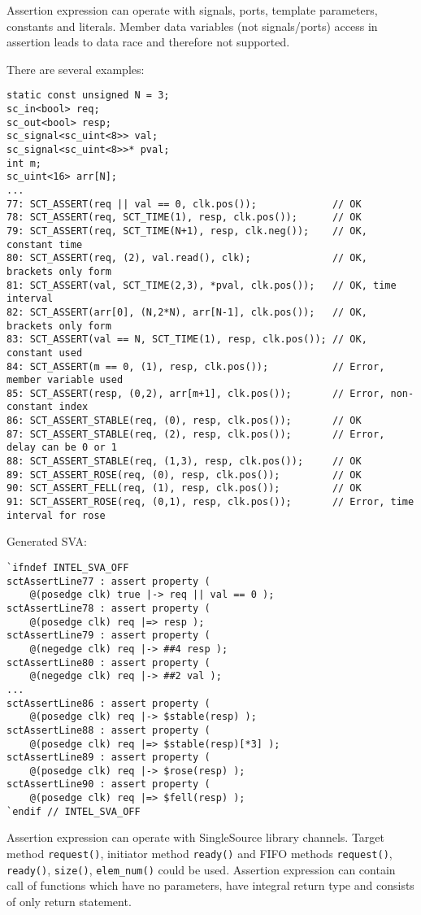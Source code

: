 Assertion expression can operate with signals, ports, template parameters, constants and literals. Member data variables (not signals/ports) access in assertion leads to data race and therefore not supported. 

There are several examples:
\begin{lstlisting}[style=mycpp]
static const unsigned N = 3;
sc_in<bool> req;
sc_out<bool> resp;
sc_signal<sc_uint<8>> val;
sc_signal<sc_uint<8>>* pval;
int m;
sc_uint<16> arr[N];
...
77: SCT_ASSERT(req || val == 0, clk.pos());             // OK
78: SCT_ASSERT(req, SCT_TIME(1), resp, clk.pos());      // OK
79: SCT_ASSERT(req, SCT_TIME(N+1), resp, clk.neg());    // OK, constant time
80: SCT_ASSERT(req, (2), val.read(), clk);              // OK, brackets only form
81: SCT_ASSERT(val, SCT_TIME(2,3), *pval, clk.pos());   // OK, time interval
82: SCT_ASSERT(arr[0], (N,2*N), arr[N-1], clk.pos());   // OK, brackets only form
83: SCT_ASSERT(val == N, SCT_TIME(1), resp, clk.pos()); // OK, constant used
84: SCT_ASSERT(m == 0, (1), resp, clk.pos());           // Error, member variable used
85: SCT_ASSERT(resp, (0,2), arr[m+1], clk.pos());       // Error, non-constant index
86: SCT_ASSERT_STABLE(req, (0), resp, clk.pos());       // OK
87: SCT_ASSERT_STABLE(req, (2), resp, clk.pos());       // Error, delay can be 0 or 1
88: SCT_ASSERT_STABLE(req, (1,3), resp, clk.pos());     // OK
89: SCT_ASSERT_ROSE(req, (0), resp, clk.pos());         // OK  
90: SCT_ASSERT_FELL(req, (1), resp, clk.pos());         // OK  
91: SCT_ASSERT_ROSE(req, (0,1), resp, clk.pos());       // Error, time interval for rose
\end{lstlisting}
%
Generated SVA:
\begin{lstlisting}[style=myverilog]
`ifndef INTEL_SVA_OFF
sctAssertLine77 : assert property (
    @(posedge clk) true |-> req || val == 0 );
sctAssertLine78 : assert property (
    @(posedge clk) req |=> resp );
sctAssertLine79 : assert property (
    @(negedge clk) req |-> ##4 resp );
sctAssertLine80 : assert property (
    @(negedge clk) req |-> ##2 val );
...
sctAssertLine86 : assert property (
    @(posedge clk) req |-> $stable(resp) );
sctAssertLine88 : assert property (
    @(posedge clk) req |=> $stable(resp)[*3] );
sctAssertLine89 : assert property (
    @(posedge clk) req |-> $rose(resp) );
sctAssertLine90 : assert property (
    @(posedge clk) req |=> $fell(resp) );
`endif // INTEL_SVA_OFF
\end{lstlisting}

Assertion expression can operate with SingleSource library channels. Target method {\tt request()}, initiator method {\tt ready()} and FIFO methods {\tt request()}, {\tt ready()}, {\tt size()}, {\tt elem\_num()} could be used. 
Assertion expression can contain call of functions which have no parameters, have integral return type and consists of only return statement.


